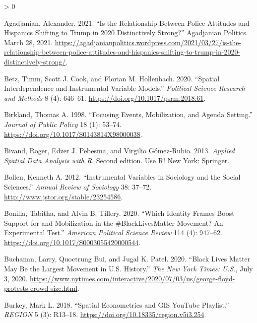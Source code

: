 \documentclass[
  12pt,
]{article}
\newlength{\cslhangindent}
\newenvironment{CSLReferences}[2] %
 {%
  \setlength{\parindent}{0pt}
  \ifodd #1 \everypar{\setlength{\hangindent}{\cslhangindent}}\ignorespaces\fi
  \ifnum #2 > 0
  \setlength{\parskip}{#2\baselineskip}
  \fi
 }%
 {}
\begin{document}
\hypertarget{refs}{}
\begin{CSLReferences}{1}{0}
\leavevmode\hypertarget{ref-Agadjanian2021}{}%
Agadjanian, Alexander. 2021. {``Is the {Relationship} Between {Police Attitudes} and {Hispanics Shifting} to {Trump} in 2020 {Distinctively Strong}?''} {Agadjanian Politics}. March 28, 2021. \url{https://agadjanianpolitics.wordpress.com/2021/03/27/is-the-relationship-between-police-attitudes-and-hispanics-shifting-to-trump-in-2020-distinctively-strong/}.

\leavevmode\hypertarget{ref-Betz2020}{}%
Betz, Timm, Scott J. Cook, and Florian M. Hollenbach. 2020. {``Spatial Interdependence and Instrumental Variable Models.''} \emph{Political Science Research and Methods} 8 (4): 646--61. \url{https://doi.org/10.1017/psrm.2018.61}.

\leavevmode\hypertarget{ref-Birkland1998}{}%
Birkland, Thomas A. 1998. {``Focusing {Events}, {Mobilization}, and {Agenda Setting}.''} \emph{Journal of Public Policy} 18 (1): 53--74. \url{https://doi.org/10.1017/S0143814X98000038}.

\leavevmode\hypertarget{ref-Bivand2013}{}%
Bivand, Roger, Edzer J. Pebesma, and Virgilio Gómez-Rubio. 2013. \emph{Applied Spatial Data Analysis with {R}}. Second edition. Use {R}! {New York}: {Springer}.

\leavevmode\hypertarget{ref-Bollen2012}{}%
Bollen, Kenneth A. 2012. {``Instrumental {Variables} in {Sociology} and the {Social Sciences}.''} \emph{Annual Review of Sociology} 38: 37--72. \url{http://www.jstor.org/stable/23254586}.

\leavevmode\hypertarget{ref-Bonilla2020}{}%
Bonilla, Tabitha, and Alvin B. Tillery. 2020. {``Which {Identity Frames Boost Support} for and {Mobilization} in the \#{BlackLivesMatter Movement}? {An Experimental Test}.''} \emph{American Political Science Review} 114 (4): 947--62. \url{https://doi.org/10.1017/S0003055420000544}.

\leavevmode\hypertarget{ref-Buchanan2020}{}%
Buchanan, Larry, Quoctrung Bui, and Jugal K. Patel. 2020. {``Black {Lives Matter May Be} the {Largest Movement} in {U}.{S}. {History}.''} \emph{The New York Times: U.S.}, July 3, 2020. \url{https://www.nytimes.com/interactive/2020/07/03/us/george-floyd-protests-crowd-size.html}.

\leavevmode\hypertarget{ref-Burkey2018}{}%
Burkey, Mark L. 2018. {``Spatial {Econometrics} and {GIS YouTube Playlist}.''} \emph{REGION} 5 (3): R13--18. \url{https://doi.org/10.18335/region.v5i3.254}.


\end{CSLReferences}
\end{document}
